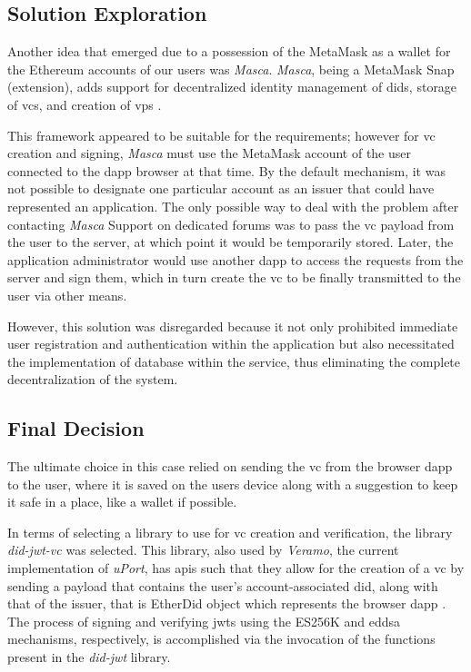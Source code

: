 \subsection{Solution Exploration}

Another idea that emerged due to a possession of the MetaMask as a wallet for the Ethereum accounts of our users was \textit{Masca}. \textit{Masca}, being a MetaMask Snap (extension), adds 
support for decentralized identity management of \gls{did}s, storage of \gls{vc}s, and creation of \gls{vp}s \cite{masca}. 

This framework appeared to be suitable for the requirements; however for \gls{vc} creation and signing, \textit{Masca} must use the MetaMask account of the user connected to the 
\gls{dapp} browser at that time. By the default mechanism, it was not possible to designate one particular account as an issuer that could have represented an application. 
The only possible way to deal with the problem after contacting \textit{Masca} Support on dedicated forums was to pass the \gls{vc} payload from the user to the server, at which point it 
would be temporarily stored. Later, the application administrator would use another \gls{dapp} to access the requests from the server and sign them, which in turn create the \gls{vc} to be 
finally transmitted to the user via other means. 

However, this solution was disregarded because it not only prohibited immediate user registration and authentication within the application but also necessitated the 
implementation of database within the service, thus eliminating the complete decentralization of the system.

\subsection{Final Decision}

The ultimate choice in this case relied on sending the \gls{vc} from the browser \gls{dapp} to the user, where it is saved on the users device along with a suggestion to keep it 
safe in a place, like a wallet if possible.

In terms of selecting a library to use for \gls{vc} creation and verification, the library \textit{did-jwt-vc} was selected. This library, also used by \textit{Veramo}, the current implementation 
of \textit{uPort}, has \gls{api}s such that they allow for the creation of a \gls{vc} by sending a payload that contains the user's account-associated \gls{did}, along with that of the issuer, that 
is EtherDid object which represents the browser \gls{dapp} \cite{did-jwt-vc}. The process of signing and verifying \gls{jwt}s using the ES256K and \gls{eddsa} mechanisms, respectively, is accomplished 
via the invocation of the functions present in the \textit{did-jwt} library.

